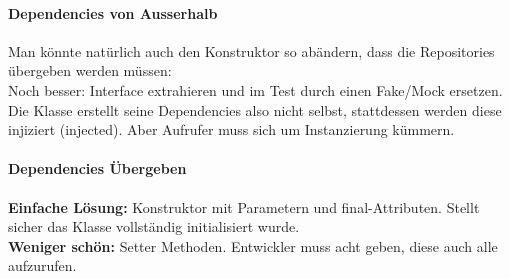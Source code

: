 \paragraph{Dependencies von Ausserhalb}
Man könnte natürlich auch den Konstruktor so abändern, dass die Repositories übergeben werden müssen:  \\
Noch besser: Interface extrahieren und im Test durch einen Fake/Mock ersetzen. Die Klasse erstellt seine Dependencies also nicht selbst, stattdessen werden diese injiziert (injected). Aber Aufrufer muss sich um Instanzierung kümmern. \\
\paragraph{Dependencies Übergeben}
\textbf{Einfache Lösung:} Konstruktor mit Parametern und final-Attributen. Stellt sicher das Klasse vollständig initialisiert wurde. \\
\textbf{Weniger schön:} Setter Methoden. Entwickler muss acht geben, diese auch alle aufzurufen. \\
